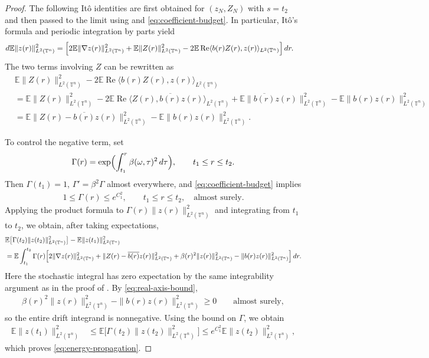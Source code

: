 \documentclass[print,wide]{draft}
\begin{document}
\begin{proof}
The following It\^o identities are first obtained for $(z_N,Z_N)$ with $s=t_2$
and then passed to the limit using  and
\eqref{eq:coefficient-budget}. In particular, It\^o's formula
and periodic integration by parts yield
\begin{align*}
d\mathbb E\|z(r)\|_{L^2(\mathbb T^n)}^2
&=\Bigl[2\mathbb E\|\nabla z(r)\|_{L^2(\mathbb T^n)}^2
+\mathbb E\|Z(r)\|_{L^2(\mathbb T^n)}^2
-2\mathbb E\operatorname{Re}\langle b(r)Z(r),z(r)\rangle_{L^2(\mathbb T^n)}\Bigr]\,dr.
\end{align*}
The two terms involving $Z$ can be rewritten as
\begin{align*}
&\mathbb E\|Z(r)\|_{L^2(\mathbb T^n)}^2
-2\mathbb E\operatorname{Re}\langle b(r)Z(r),z(r)\rangle_{L^2(\mathbb T^n)}\\
&=\mathbb E\|Z(r)\|_{L^2(\mathbb T^n)}^2
-2\mathbb E\operatorname{Re}\langle Z(r),\overline{b(r)}z(r)\rangle_{L^2(\mathbb T^n)}
+\mathbb E\|\overline{b(r)}z(r)\|_{L^2(\mathbb T^n)}^2
-\mathbb E\|b(r)z(r)\|_{L^2(\mathbb T^n)}^2\\
&=\mathbb E\|Z(r)-\overline{b(r)}z(r)\|_{L^2(\mathbb T^n)}^2
-\mathbb E\|b(r)z(r)\|_{L^2(\mathbb T^n)}^2.
\end{align*}

To control the negative term, set
\begin{align*}
\Gamma(r)=\exp\Bigl(\int_{t_1}^r\beta(\omega,\tau)^2\,d\tau\Bigr),
\qquad t_1\le r\le t_2.
\end{align*}
Then $\Gamma(t_1)=1$, $\Gamma'=\beta^2\Gamma$ almost everywhere, and
\eqref{eq:coefficient-budget} implies
\begin{align*}
1\le\Gamma(r)\le e^{C_1^2},
\qquad t_1\le r\le t_2,
\quad\text{almost surely}.
\end{align*}
Applying the product formula to $\Gamma(r)\|z(r)\|_{L^2(\mathbb T^n)}^2$
and integrating from $t_1$ to $t_2$, we obtain, after taking expectations,
\begin{align*}
&\mathbb E\bigl[\Gamma(t_2)\|z(t_2)\|_{L^2(\mathbb T^n)}^2\bigr]
-\mathbb E\|z(t_1)\|_{L^2(\mathbb T^n)}^2\\
&=\mathbb E\int_{t_1}^{t_2}\Gamma(r)\Bigl[
2\|\nabla z(r)\|_{L^2(\mathbb T^n)}^2
+\|Z(r)-\overline{b(r)}z(r)\|_{L^2(\mathbb T^n)}^2
+\beta(r)^2\|z(r)\|_{L^2(\mathbb T^n)}^2
-\|b(r)z(r)\|_{L^2(\mathbb T^n)}^2\Bigr]\,dr.
\end{align*}
Here the stochastic integral has zero expectation by the same integrability argument
as in the proof of .
By \eqref{eq:real-axis-bound},
\begin{align*}
\beta(r)^2\|z(r)\|_{L^2(\mathbb T^n)}^2
-\|b(r)z(r)\|_{L^2(\mathbb T^n)}^2\ge0
\qquad\text{almost surely},
\end{align*}
so the entire drift integrand is nonnegative.
Using the bound on $\Gamma$, we obtain
\begin{align*}
\mathbb E\|z(t_1)\|_{L^2(\mathbb T^n)}^2
&\le\mathbb E\bigl[\Gamma(t_2)\|z(t_2)\|_{L^2(\mathbb T^n)}^2\bigr]
\le e^{C_1^2}\mathbb E\|z(t_2)\|_{L^2(\mathbb T^n)}^2,
\end{align*}
which proves \eqref{eq:energy-propagation}.
\end{proof}
\end{document}
